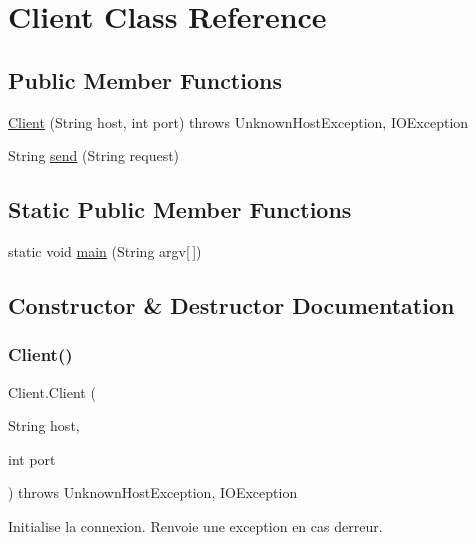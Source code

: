 \hypertarget{class_client}{}\section{Client Class Reference}
\label{class_client}
\subsection*{Public Member Functions}
\begin{DoxyCompactItemize}
\item 
\mbox{\hyperlink{class_client_a163113b9c3fda23dcdc750db9278afbe}{Client}} (String host, int port)  throws Unknown\+Host\+Exception, I\+O\+Exception 
\item 
String \mbox{\hyperlink{class_client_ab26831c395da92b5893066f9ce7963a4}{send}} (String request)
\end{DoxyCompactItemize}
\subsection*{Static Public Member Functions}
\begin{DoxyCompactItemize}
\item 
static void \mbox{\hyperlink{class_client_ac9fec818083d641b633a8e4a75d981a7}{main}} (String argv\mbox{[}$\,$\mbox{]})
\end{DoxyCompactItemize}


\subsection{Constructor \& Destructor Documentation}
\mbox{\label{class_client_a163113b9c3fda23dcdc750db9278afbe}} 
\subsubsection{\texorpdfstring{Client()}{Client()}}
{\footnotesize\ttfamily Client.\+Client (\begin{DoxyParamCaption}\item[{String}]{host,  }\item[{int}]{port }\end{DoxyParamCaption}) throws Unknown\+Host\+Exception, I\+O\+Exception\hspace{0.3cm}{\ttfamily [inline]}}

Initialise la connexion. Renvoie une exception en cas d\textquotesingle{}erreur. 

